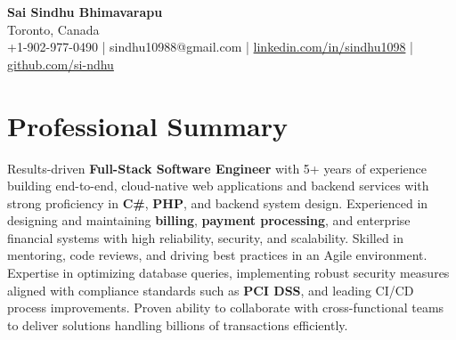 \documentclass[letterpaper,11pt]{article}
\begin{document}
\begin{center}
  {\Large \textbf{Sai Sindhu Bhimavarapu}} \\
  Toronto, Canada \\
  +1-902-977-0490 \enspace | \enspace sindhu10988@gmail.com \enspace | \enspace \href{https://www.linkedin.com/in/sindhu1098/}{linkedin.com/in/sindhu1098} \enspace | \enspace \href{https://github.com/si-ndhu}{github.com/si-ndhu}
\end{center}

\section{Professional Summary}
  \begin{itemize}[leftmargin=0.15in, label={}]
    \small{\item{
     Results-driven \textbf{Full-Stack Software Engineer} with 5+ years of experience building end-to-end, cloud-native web applications and backend services with strong proficiency in \textbf{C\#}, \textbf{PHP}, and backend system design. Experienced in designing and maintaining \textbf{billing}, \textbf{payment processing}, and enterprise financial systems with high reliability, security, and scalability. Skilled in mentoring, code reviews, and driving best practices in an Agile environment. Expertise in optimizing database queries, implementing robust security measures aligned with compliance standards such as \textbf{PCI DSS}, and leading CI/CD process improvements. Proven ability to collaborate with cross-functional teams to deliver solutions handling billions of transactions efficiently.
    }}
  \end{itemize}
\vspace{-16pt}

\end{document}
